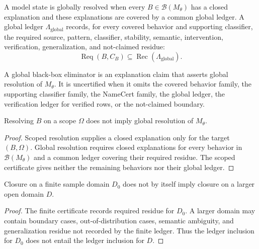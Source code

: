 \begin{definition}
\label{def:philosophy-global-resolution-ledger}
A model state is globally resolved when every
$B\in\mathcal B(M_\theta)$ has a closed explanation and these
explanations are covered by a common global ledger. A global ledger
$\Lambda_{\mathrm{global}}$ records, for every covered behavior and
supporting classifier, the required source, pattern, classifier,
stability, semantic, intervention, verification, generalization, and
not-claimed residue:
$$
\operatorname{Req}(B,C_B)
\subseteq
\operatorname{Rec}(\Lambda_{\mathrm{global}}).
$$
\end{definition}

\begin{definition}
\label{def:philosophy-global-black-box-eliminator}
A global black-box eliminator is an explanation claim that asserts
global resolution of $M_\theta$. It is uncertified when it omits the
covered behavior family, the supporting classifier family, the NameCert
family, the global ledger, the verification ledger for verified rows, or
the not-claimed boundary.
\end{definition}

\begin{theorem}
\label{thm:philosophy-scoped-resolution-not-global-resolution}
Resolving $B$ on a scope $\Omega$ does not imply global resolution of
$M_\theta$.
\end{theorem}
\begin{proof}
Scoped resolution supplies a closed explanation only for the target
$(B,\Omega)$. Global resolution requires closed explanations for every
behavior in $\mathcal B(M_\theta)$ and a common ledger covering their
required residue. The scoped certificate gives neither the remaining
behaviors nor their global ledger.
\end{proof}


\begin{theorem}
\label{thm:philosophy-finite-sample-closure-not-open-domain-closure}
Closure on a finite sample domain $D_0$ does not by itself imply closure
on a larger open domain $D$.
\end{theorem}
\begin{proof}
The finite certificate records required residue for $D_0$. A larger
domain may contain boundary cases, out-of-distribution cases, semantic
ambiguity, and generalization residue not recorded by the finite ledger.
Thus the ledger inclusion for $D_0$ does not entail the ledger inclusion
for $D$.
\end{proof}

